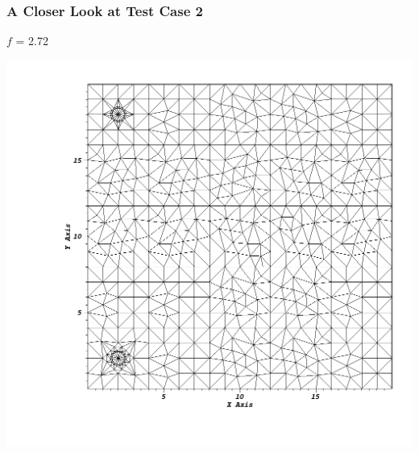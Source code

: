 \documentclass[]{beamer}
\begin{document}
\begin{frame}[t]\frametitle{A Closer Look at Test Case 2}
\begin{minipage}{0.15\textwidth}
\begin{footnotesize}
$f$ = 2.72
\end{footnotesize}
\end{minipage}
\begin{minipage}{0.8\textwidth}
\centering
\includegraphics[scale=0.22]{figures/sameside_before.png}
\end{minipage}
\end{frame}
\end{document}
